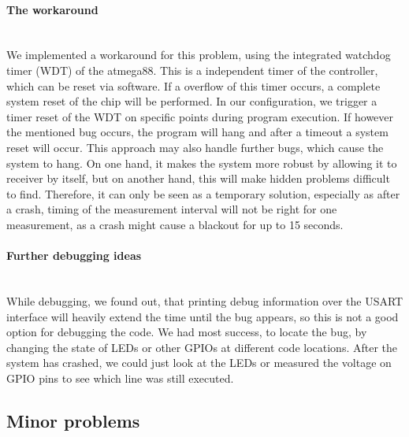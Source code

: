 \documentclass[a4paper]{scrreprt}
\begin{document}
\paragraph{The workaround}\hspace{1cm}\\
We implemented a workaround for this problem, using the integrated watchdog
timer (WDT) of the atmega88. This is a independent timer of the
controller, which can be reset via software. If a overflow of this timer occurs,
a complete system reset of the chip will be performed. In our configuration, we
trigger a timer reset of the WDT on specific points during program execution.
If however the mentioned bug occurs, the program will hang and after a timeout
a system reset will occur. 
This approach may also handle further bugs, which cause the system to hang.
On one hand, it makes the system more robust by allowing it to receiver by itself,
but on another hand, this will make hidden problems difficult to find. 
Therefore, it can only be seen as a temporary solution, especially as after a crash,
timing of the measurement interval will not be right
for one measurement, as a crash might cause a blackout for up to 15 seconds.
\paragraph{Further debugging ideas}\hspace{1cm}\\
While debugging, we found out, that printing debug information over the USART
interface will heavily extend the time until the bug appears, so this is not a
good option for debugging the code. We had most success, to locate the bug,
by changing the state of LEDs or other GPIOs at different code locations. After
the system has crashed, we could just look at the LEDs or measured the voltage on
GPIO pins to see which line was still executed.
\subsection{Minor problems}
\end{document}
